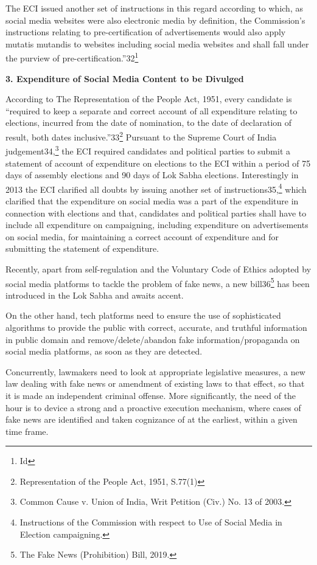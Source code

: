 \begin{multicols}{2}
\noi
The ECI issued another set of instructions in this regard according to which, as social media
websites were also electronic media by definition, the Commission’s instructions relating to 
pre-certification of advertisements would also apply mutatis mutandis to websites including
social media websites and shall fall under the purview of pre-certification.”32\footnote{Id}

\noi
{\large\bfseries 3. Expenditure of Social Media Content to be Divulged}

\noi
According to The Representation of the People Act, 1951, every candidate is “required to
keep a separate and correct account of all expenditure relating to elections, incurred from the
date of nomination, to the date of declaration of result, both dates inclusive.”33\footnote{Representation of the People Act, 1951, S.77(1)} Pursuant to
the Supreme Court of India judgement34,\footnote{Common Cause v. Union of India, Writ Petition (Civ.) No. 13 of 2003.} the ECI required candidates and political parties to
submit a statement of account of expenditure on elections to the ECI within a period of 75
days of assembly elections and 90 days of Lok Sabha elections. Interestingly in 2013 the ECI
clarified all doubts by issuing another set of instructions35,\footnote{Instructions of the Commission with respect to Use of Social Media in Election campaigning.} which clarified that the
expenditure on social media was a part of the expenditure in connection with elections and
that, candidates and political parties shall have to include all expenditure on campaigning,
including expenditure on advertisements on social media, for maintaining a correct account
of expenditure and for submitting the statement of expenditure.

\noi
Recently, apart from self-regulation and the Voluntary Code of Ethics adopted by social
media platforms to tackle the problem of fake news, a new bill36\footnote{The Fake News (Prohibition) Bill, 2019.} has been introduced in the
Lok Sabha and awaits accent.

\noi
On the other hand, tech platforms need to ensure the use of sophisticated algorithms to
provide the public with correct, accurate, and truthful information in public domain and
remove/delete/abandon fake information/propaganda on social media platforms, as soon as
they are detected.

\noi
Concurrently, lawmakers need to look at appropriate legislative measures, a new law dealing
with fake news or amendment of existing laws to that effect, so that it is made an independent
criminal offense. More significantly, the need of the hour is to device a strong and a proactive
execution mechanism, where cases of fake news are identified and taken cognizance of at the
earliest, within a given time frame. 

\end{multicols}
